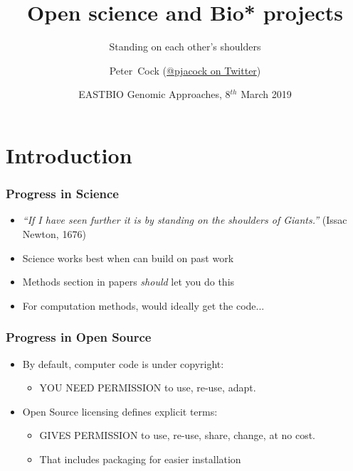 


\title[Open science and Bio* projects] %
{Open science and Bio* projects}
\subtitle{Standing on each other's shoulders}
\author[Cock] %
{Peter~Cock (\href{https://twitter.com/pjacock}{@pjacock on Twitter})}
\date[July 2019] %
{EASTBIO Genomic Approaches, 8$^{th}$ March 2019}
\subject{Bioinformatics}





\frame[plain]{\titlepage}

\section{Introduction}

\begin{frame}
  \frametitle{Progress in Science}
  \begin{itemize}
    \item \emph{``If I have seen further it is by standing on the shoulders of Giants.''} (Issac Newton, 1676)
    \item Science works best when can build on past work
    \item Methods section in papers \emph{should} let you do this
    \item For computation methods, would ideally get the code...
  \end{itemize}
\end{frame}

\begin{frame}
  \frametitle{Progress in Open Source}
  \begin{itemize}
    \item By default, computer code is under copyright:
      \begin{itemize}
        \item YOU NEED PERMISSION to use, re-use, adapt.
      \end{itemize}
    \item Open Source licensing defines explicit terms:
      \begin{itemize}
        \item GIVES PERMISSION to use, re-use, share, change, at no cost.
        \item That includes packaging for easier installation
      \end{itemize}
  \end{itemize}
\end{frame}


